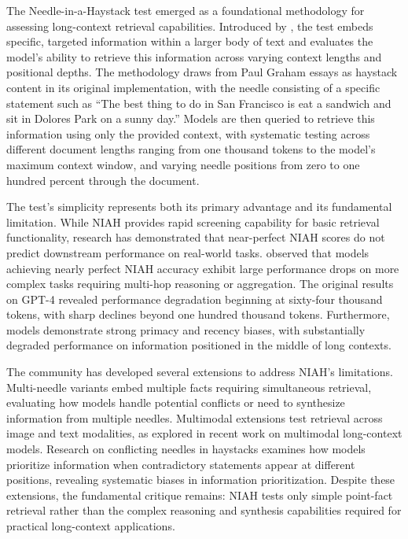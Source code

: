 The Needle-in-a-Haystack test emerged as a foundational methodology for assessing long-context retrieval capabilities. Introduced by \citet{kamradt2023needle}, the test embeds specific, targeted information within a larger body of text and evaluates the model's ability to retrieve this information across varying context lengths and positional depths. The methodology draws from Paul Graham essays as haystack content in its original implementation, with the needle consisting of a specific statement such as ``The best thing to do in San Francisco is eat a sandwich and sit in Dolores Park on a sunny day.'' Models are then queried to retrieve this information using only the provided context, with systematic testing across different document lengths ranging from one thousand tokens to the model's maximum context window, and varying needle positions from zero to one hundred percent through the document.

The test's simplicity represents both its primary advantage and its fundamental limitation. While NIAH provides rapid screening capability for basic retrieval functionality, research has demonstrated that near-perfect NIAH scores do not predict downstream performance on real-world tasks. \citet{hsieh2024ruler} observed that models achieving nearly perfect NIAH accuracy exhibit large performance drops on more complex tasks requiring multi-hop reasoning or aggregation. The original results on GPT-4 revealed performance degradation beginning at sixty-four thousand tokens, with sharp declines beyond one hundred thousand tokens. Furthermore, models demonstrate strong primacy and recency biases, with substantially degraded performance on information positioned in the middle of long contexts.

The community has developed several extensions to address NIAH's limitations. Multi-needle variants embed multiple facts requiring simultaneous retrieval, evaluating how models handle potential conflicts or need to synthesize information from multiple needles. Multimodal extensions test retrieval across image and text modalities, as explored in recent work on multimodal long-context models. Research on conflicting needles in haystacks examines how models prioritize information when contradictory statements appear at different positions, revealing systematic biases in information prioritization. Despite these extensions, the fundamental critique remains: NIAH tests only simple point-fact retrieval rather than the complex reasoning and synthesis capabilities required for practical long-context applications.

